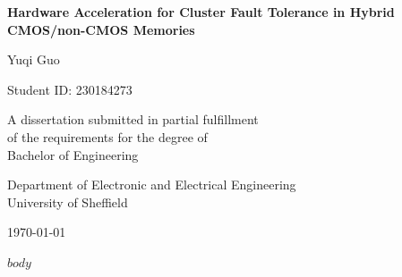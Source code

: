 \documentclass[12pt, a4paper]{report}
\begin{document}
\begin{titlepage}
    \centering
    \vspace*{2cm}
    
    {\LARGE\bfseries Hardware Acceleration for Cluster Fault Tolerance in Hybrid CMOS/non-CMOS Memories\par}
    
    \vspace{1.5cm}
    
    {\Large Yuqi Guo\par}
    {\large Student ID: 230184273\par}
    
    \vspace{1cm}
    
    {\large A dissertation submitted in partial fulfillment\\
    of the requirements for the degree of\\
    Bachelor of Engineering\par}
    
    \vspace{1.5cm}
    
    {\large Department of Electronic and Electrical Engineering\\
    University of Sheffield\par}
    
    \vspace{1cm}
    
    {\large \today\par}
    
    \vfill
\end{titlepage}

\begin{abstract}
\end{abstract}

\tableofcontents
\newpage

$body$
\end{document}
